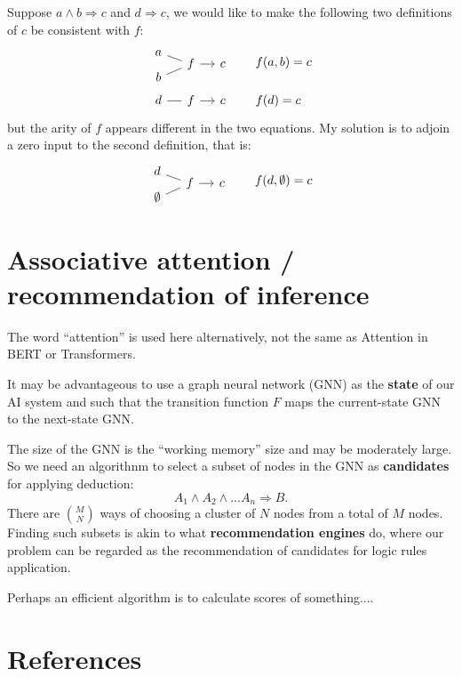 Suppose $a \wedge b \Rightarrow c$ and $d \Rightarrow c$, we would like to make the following two definitions of $c$ be consistent with $f$:
\begin{eqnarray}
\begin{tikzcd}[column sep=small, row sep=-0.5em]
a \arrow[-, dr] & & \\
& f \arrow[r] & c\\
b \arrow[-, ur] & &
\end{tikzcd} 
& \qquad f(a,b) = c \\
\begin{tikzcd}[column sep=small]
d \arrow[-, r] & f \arrow[r] & c
\end{tikzcd} 
& \qquad f(d) = c
\nonumber 
\end{eqnarray}
but the arity of $f$ appears different in the two equations.  My solution is to adjoin a zero input to the second definition, that is:
\begin{equation}
\begin{tikzcd}[column sep=small, row sep=-0.5em]
d \arrow[-, dr] & & \\
& f \arrow[r] & c\\
\emptyset \arrow[-, ur] & &
\end{tikzcd}
\qquad f(d, \emptyset) = c
\end{equation}

\section{Associative attention / recommendation of inference}

The word ``attention'' is used here alternatively, not the same as Attention in BERT or Transformers.

It may be advantageous to use a graph neural network (GNN) as the \textbf{state} of our AI system and such that the transition function $F$ maps the current-state GNN to the next-state GNN.

The size of the GNN is the ``working memory'' size and may be moderately large.  So we need an algorithnm to select a subset of nodes in the GNN as \textbf{candidates} for applying deduction:
\begin{equation}
A_1 \wedge A_2 \wedge ... A_n \Rightarrow B .
\end{equation}
There are $M \choose N$ ways of choosing a cluster of $N$ nodes from a total of $M$ nodes.  Finding such subsets is akin to what \textbf{recommendation engines} do, where our problem can be regarded as the recommendation of candidates for logic rules application.

Perhaps an efficient algorithm is to calculate scores of something....

\section*{References}
 \smiley \\ \vspace*{0.4cm}

 
